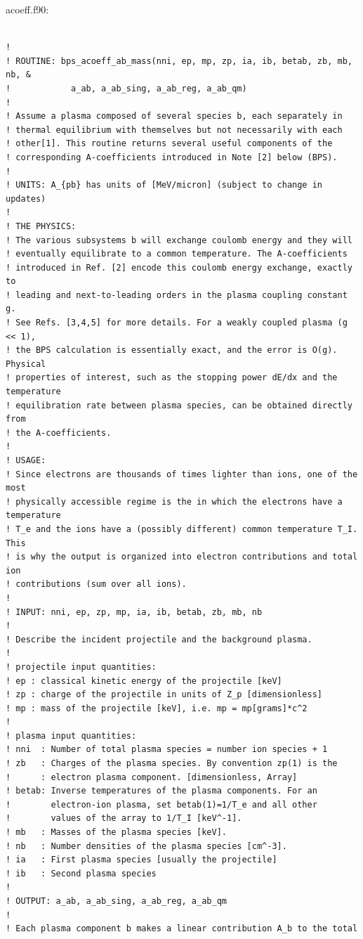 \documentclass[preprint,12pt,eqsecnum,nofootinbib,amsmath,amssymb]{revtex4}
\begin{document}
\vskip1cm 
\noindent
acoeff.f90:
{
\baselineskip 10pt
\begin{verbatim}

! 
! ROUTINE: bps_acoeff_ab_mass(nni, ep, mp, zp, ia, ib, betab, zb, mb, nb, &
!            a_ab, a_ab_sing, a_ab_reg, a_ab_qm)
! 
! Assume a plasma composed of several species b, each separately in 
! thermal equilibrium with themselves but not necessarily with each 
! other[1]. This routine returns several useful components of the 
! corresponding A-coefficients introduced in Note [2] below (BPS).
! 
! UNITS: A_{pb} has units of [MeV/micron] (subject to change in updates)
! 
! THE PHYSICS:
! The various subsystems b will exchange coulomb energy and they will
! eventually equilibrate to a common temperature. The A-coefficients 
! introduced in Ref. [2] encode this coulomb energy exchange, exactly to 
! leading and next-to-leading orders in the plasma coupling constant g.
! See Refs. [3,4,5] for more details. For a weakly coupled plasma (g << 1), 
! the BPS calculation is essentially exact, and the error is O(g). Physical 
! properties of interest, such as the stopping power dE/dx and the temperature 
! equilibration rate between plasma species, can be obtained directly from 
! the A-coefficients. 
!
! USAGE:
! Since electrons are thousands of times lighter than ions, one of the most
! physically accessible regime is the in which the electrons have a temperature 
! T_e and the ions have a (possibly different) common temperature T_I. This 
! is why the output is organized into electron contributions and total ion 
! contributions (sum over all ions).
!
! INPUT: nni, ep, zp, mp, ia, ib, betab, zb, mb, nb
!
! Describe the incident projectile and the background plasma. 
!
! projectile input quantities:
! ep : classical kinetic energy of the projectile [keV]
! zp : charge of the projectile in units of Z_p [dimensionless]
! mp : mass of the projectile [keV], i.e. mp = mp[grams]*c^2
!
! plasma input quantities:
! nni  : Number of total plasma species = number ion species + 1
! zb   : Charges of the plasma species. By convention zp(1) is the 
!      : electron plasma component. [dimensionless, Array]
! betab: Inverse temperatures of the plasma components. For an
!        electron-ion plasma, set betab(1)=1/T_e and all other
!        values of the array to 1/T_I [keV^-1].
! mb   : Masses of the plasma species [keV]. 
! nb   : Number densities of the plasma species [cm^-3]. 
! ia   : First plasma species [usually the projectile]
! ib   : Second plasma species
!
! OUTPUT: a_ab, a_ab_sing, a_ab_reg, a_ab_qm
!
! Each plasma component b makes a linear contribution A_b to the total 

\end{verbatim}}
\end{document}
